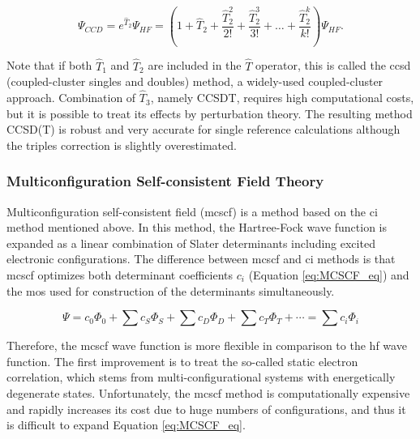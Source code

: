 \begin{refsection}
\begin{equation}
\Psi_{CCD} = e^{\widehat{T}_2}\Psi_{HF} = \left( 1 + \widehat{T}_{2} + \frac{\widehat{T}^2_2}{2!} + \frac{\widehat{T}^3_2}{3!} + \ldots + \frac{\widehat{T}^k_2}{k!}\right) \Psi_{HF}.
\label{eq:CCD_formula}
\end{equation}

\noindent Note that if both $\widehat{T}_1$ and $\widehat{T}_2$ are included in the $\widehat{T}$ operator, this is called the \acrshort{ccsd} (coupled-cluster singles and doubles) method, a widely-used coupled-cluster approach. Combination of $\widehat{T}_3$, namely CCSDT, requires  high computational costs, but it is possible to treat its effects by perturbation theory. The resulting  method CCSD(T) is robust and very accurate for single reference calculations although the triples correction is slightly overestimated.


\subsubsection{Multiconfiguration Self-consistent Field Theory}

Multiconfiguration self-consistent field (\acrshort{mcscf}) is a method based on the \acrshort{ci} method mentioned above. In this method, the Hartree-Fock wave function is expanded as a linear combination of Slater determinants including excited electronic configurations.\cite{c1:shepard1987,c1:szalay2011} The difference between \acrshort{mcscf} and \acrshort{ci} methods is that \acrshort{mcscf} optimizes both determinant coefficients $c_i$ (Equation \ref{eq:MCSCF_eq}) and the \acrshort{mo}s used for construction of the determinants simultaneously.

\begin{equation}
\Psi = c_0\Phi_{0} + \sum c_S\Phi_S + \sum c_D\Phi_D + \sum c_T\Phi_T  + \cdots = \sum c_i\Phi_i 
\label{eq:MCSCF_eq}
\end{equation}

\noindent Therefore, the \acrshort{mcscf} wave function is more flexible in comparison to the \acrshort{hf} wave function. The first improvement is to treat the so-called static electron correlation, which stems from multi-configurational systems with energetically degenerate states. Unfortunately, the \acrshort{mcscf} method is computationally expensive and rapidly increases its cost due to huge numbers of configurations, and thus it is difficult to expand Equation \ref{eq:MCSCF_eq}.




\end{refsection}
